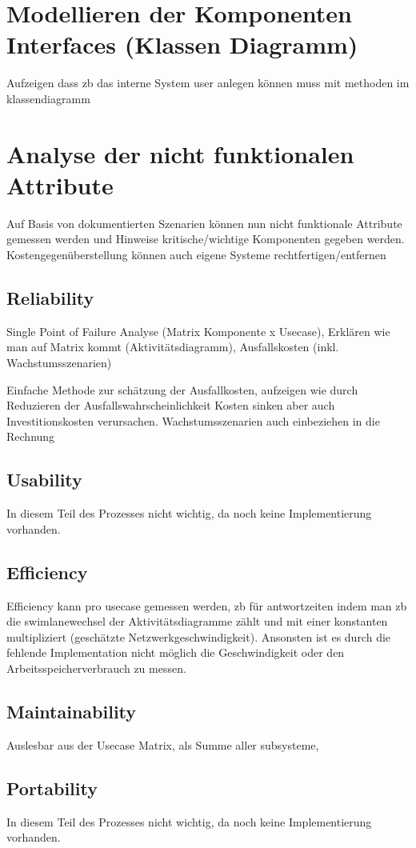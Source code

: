 \section{Modellieren der Komponenten Interfaces (Klassen Diagramm)}
Aufzeigen dass zb das interne System user anlegen können muss mit methoden im klassendiagramm

\section{Analyse der nicht funktionalen Attribute}
Auf Basis von dokumentierten Szenarien können nun nicht funktionale Attribute gemessen werden und Hinweise kritische/wichtige Komponenten gegeben werden. Kostengegenüberstellung können auch eigene Systeme rechtfertigen/entfernen

\subsection{Reliability}
Single Point of Failure Analyse (Matrix Komponente x Usecase), Erklären wie man auf Matrix kommt (Aktivitätsdiagramm), Ausfallskosten (inkl. Wachstumsszenarien)

Einfache Methode zur schätzung der Ausfallkosten, aufzeigen wie durch Reduzieren der Ausfallswahrscheinlichkeit Kosten sinken aber auch Investitionskosten verursachen. Wachstumsszenarien auch einbeziehen in die Rechnung
\subsection{Usability}
In diesem Teil des Prozesses nicht wichtig, da noch keine Implementierung vorhanden.

\subsection{Efficiency}
Efficiency kann pro usecase gemessen werden, zb für antwortzeiten indem man zb die swimlanewechsel der Aktivitätsdiagramme zählt und mit einer konstanten multipliziert (geschätzte Netzwerkgeschwindigkeit). Ansonsten ist es durch die fehlende Implementation nicht möglich die Geschwindigkeit oder den Arbeitsspeicherverbrauch zu messen.

\subsection{Maintainability}
Auslesbar aus der Usecase Matrix, als Summe aller subsysteme,

\subsection{Portability}
In diesem Teil des Prozesses nicht wichtig, da noch keine Implementierung vorhanden.

